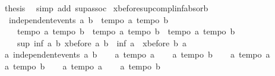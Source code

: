 \begin{isabellebody}
\ {\isacharquery}thesis\ \isamarkupfalse%
\ {\isacharparenleft}simp\ add{\isacharcolon}\ sup{\isachardot}assoc{\isacharparenright}\isanewline
{}\isamarkupfalse%
%
\endisatagproof
{\isafoldproof}%
%
\isadelimproof
\isanewline
%
\endisadelimproof
\isanewline
{}\isamarkupfalse%
\ xbefore{\isacharunderscore}sup{\isacharunderscore}compl{\isacharunderscore}inf{\isacharunderscore}absorb{}{\isacharcolon}\ \isanewline
\ \ {\isachardoublequoteopen}independent{\isacharunderscore}events\ a\ b\ {\isasymLongrightarrow}\ {\isasymlbrakk}tempo{}\ a{\isacharsemicolon}\ tempo{}\ b{\isasymrbrakk}\ {\isasymLongrightarrow}\ \isanewline
\ \ \ \ {\isasymlbrakk}tempo{}\ a{\isacharsemicolon}\ tempo{}\ b{\isasymrbrakk}\ {\isasymLongrightarrow}\ {\isasymlbrakk}tempo{}\ a{\isacharsemicolon}\ tempo{}\ b{\isasymrbrakk}\ {\isasymLongrightarrow}\ {\isasymlbrakk}tempo{}\ a{\isacharsemicolon}\ tempo{}\ b{\isasymrbrakk}\ {\isasymLongrightarrow}\isanewline
\ \ \ \ sup\ {\isacharparenleft}inf\ a\ {\isacharparenleft}{\isacharminus}b{\isacharparenright}{\isacharparenright}\ {\isacharparenleft}xbefore\ a\ b{\isacharparenright}\ {\isacharequal}\ inf\ a\ {\isacharparenleft}{\isacharminus}\ {\isacharparenleft}xbefore\ b\ a{\isacharparenright}{\isacharparenright}{\isachardoublequoteclose}\isanewline
%
\isadelimproof
%
\endisadelimproof
%
\isatagproof
{}\isamarkupfalse%
\ {\isacharminus}\isanewline
\ \ \isamarkupfalse%
\ a{}{\isacharcolon}\ {\isachardoublequoteopen}independent{\isacharunderscore}events\ a\ b{\isachardoublequoteclose}\isanewline
\ \ \isamarkupfalse%
\ a{}{\isacharcolon}\ {\isachardoublequoteopen}tempo{}\ a{\isachardoublequoteclose}\isanewline
\ \ \isamarkupfalse%
\ a{}{\isacharcolon}\ {\isachardoublequoteopen}tempo{}\ b{\isachardoublequoteclose}\isanewline
\ \ \isamarkupfalse%
\ a{}{\isacharcolon}\ {\isachardoublequoteopen}tempo{}\ a{\isachardoublequoteclose}\isanewline
\ \ \isamarkupfalse%
\ a{}{\isacharcolon}\ {\isachardoublequoteopen}tempo{}\ b{\isachardoublequoteclose}\isanewline
\ \ \isamarkupfalse%
\ a{}{\isacharcolon}\ {\isachardoublequoteopen}tempo{}\ a{\isachardoublequoteclose}\isanewline
\ \ \isamarkupfalse%
\ a{}{\isacharcolon}\ {\isachardoublequoteopen}tempo{}\ b{\isachardoublequoteclose}\isanewline

\end{isabellebody}

